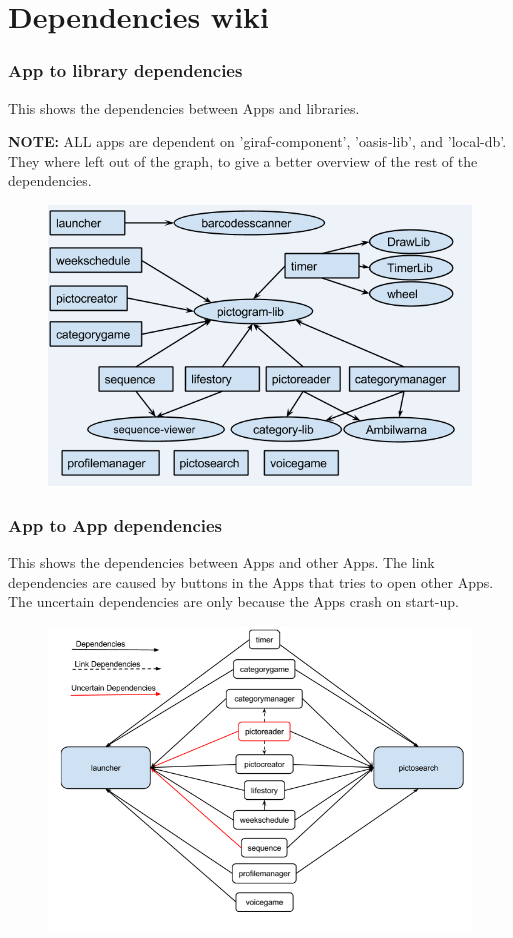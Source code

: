 \chapter{Dependencies wiki}
\subsection{App to library dependencies}
This shows the dependencies between Apps and libraries. 

\textbf{NOTE:} ALL apps are dependent on 'giraf-component', 'oasis-lib', and 'local-db'. They where left out of the graph, to give a better overview of the rest of the dependencies.

\begin{figure}[H]
	\centering
	\includegraphics[width=0.8 \textwidth]{pictures/AppLibDependenciesWiki.png}
	\caption{}
	\label{AppLibDependenciesWiki}
\end{figure}

\subsection{App to App dependencies}
This shows the dependencies between Apps and other Apps. The link dependencies are caused by buttons in the Apps that tries to open other Apps. The uncertain dependencies are only because the Apps crash on start-up.

\begin{figure}[H]
	\centering
	\includegraphics[width=0.8 \textwidth]{pictures/AppAppDependenciesWiki.png}
	\caption{}
	\label{LibLibDependenciesWiki}
\end{figure}


